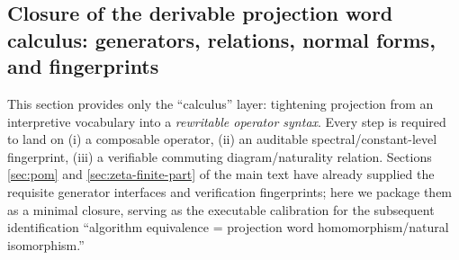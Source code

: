 \subsection{Closure of the derivable projection word calculus: generators, relations, normal forms, and fingerprints}\label{subsec:pom-derivable-calculus-closure}
This section provides only the ``calculus'' layer: tightening projection from an interpretive vocabulary into a \emph{rewritable operator syntax}. Every step is required to land on
(i) a composable operator,
(ii) an auditable spectral/constant-level fingerprint,
(iii) a verifiable commuting diagram/naturality relation.
Sections \ref{sec:pom} and \ref{sec:zeta-finite-part} of the main text have already supplied the requisite generator interfaces and verification fingerprints; here we package them as a minimal closure, serving as the executable calibration for the subsequent identification ``algorithm equivalence = projection word homomorphism/natural isomorphism.''


